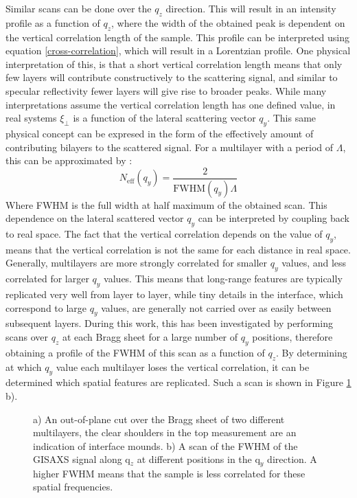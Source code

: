 Similar scans can be done over the $q_z$ direction. This will result in an intensity profile as a function of $q_z$, where the width of the obtained peak is dependent on the vertical correlation length of the sample. This profile can be interpreted using equation \ref{cross-correlation}, which will result in a Lorentzian profile. One physical interpretation of this, is that a short vertical correlation length means that only few layers will contribute constructively to the scattering signal, and similar to specular reflectivity fewer layers will give rise to broader peaks. While many interpretations assume the vertical correlation length has one defined value, in real systems $\xi_{\perp}$ is a function of the lateral scattering vector $q_y$. This same physical concept can be expresed in the form of the effectively amount of contributing bilayers to the scattered signal. For a multilayer with a period of $\Lambda$, this can be approximated by \cite{salditt_correlated}\cite{effective_bilayers}:
\begin{equation}
	N_{\textrm{eff}}(q_y) =\frac{2}{\textrm{FWHM} (q_y) \Lambda}
\end{equation}
Where FWHM is the full width at half maximum of the obtained scan. This dependence on the lateral scattered vector $q_y$ can be interpreted by coupling back to real space. The fact that the vertical correlation depends on the value of $q_y$, means that the vertical correlation is not the same for each distance in real space. Generally, multilayers are more strongly correlated for smaller $q_y$ values, and less correlated for larger $q_y$ values. This means that long-range features are typically replicated very well from layer to layer, while tiny details in the interface, which correspond to large $q_y$ values, are generally not carried over as easily between subsequent layers. During this work, this has been investigated by performing scans over $q_z$ at each Bragg sheet for a large number of $q_y$ positions, therefore obtaining a profile of the FWHM of this scan as a function of $q_z$. By determining at which $q_y$ value each multilayer loses the vertical correlation, it can be determined which spatial features are replicated. Such a scan is shown in Figure \ref{gisaxs_signal} b).
\begin{figure}
	\centering
	\def\svgwidth{\textwidth}
	
	\caption{a) An out-of-plane cut over the Bragg sheet of two different multilayers, the clear shoulders in the top measurement are an indication of interface mounds. b) A scan of the FWHM of the GISAXS signal along q$_z$ at different positions in the q$_y$ direction. A higher FWHM means that the sample is less correlated for these spatial frequencies.}
	\label{gisaxs_signal}
\end{figure}\clearpage
